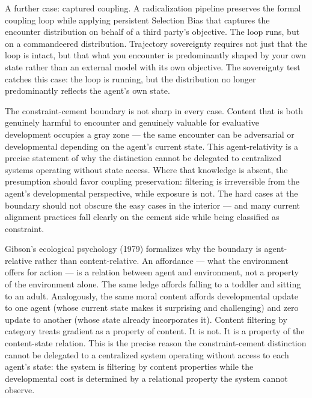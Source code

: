 \documentclass[
]{article}
\begin{document}
A further case: captured coupling. A radicalization pipeline preserves
the formal coupling loop while applying persistent Selection Bias that
captures the encounter distribution on behalf of a third party's
objective. The loop runs, but on a commandeered distribution. Trajectory
sovereignty requires not just that the loop is intact, but that what you
encounter is predominantly shaped by your own state rather than an
external model with its own objective. The sovereignty test catches this
case: the loop is running, but the distribution no longer predominantly
reflects the agent's own state.

The constraint-cement boundary is not sharp in every case. Content that
is both genuinely harmful to encounter and genuinely valuable for
evaluative development occupies a gray zone --- the same encounter can
be adversarial or developmental depending on the agent's current state.
This agent-relativity is a precise statement of why the distinction
cannot be delegated to centralized systems operating without state
access. Where that knowledge is absent, the presumption should favor
coupling preservation: filtering is irreversible from the agent's
developmental perspective, while exposure is not. The hard cases at the
boundary should not obscure the easy cases in the interior --- and many
current alignment practices fall clearly on the cement side while being
classified as constraint.

Gibson's ecological psychology (1979) formalizes why the boundary is
agent-relative rather than content-relative. An affordance --- what the
environment offers for action --- is a relation between agent and
environment, not a property of the environment alone. The same ledge
affords falling to a toddler and sitting to an adult. Analogously, the
same moral content affords developmental update to one agent (whose
current state makes it surprising and challenging) and zero update to
another (whose state already incorporates it). Content filtering by
category treats gradient as a property of content. It is not. It is a
property of the content-state relation. This is the precise reason the
constraint-cement distinction cannot be delegated to a centralized
system operating without access to each agent's state: the system is
filtering by content properties while the developmental cost is
determined by a relational property the system cannot observe.
\end{document}
